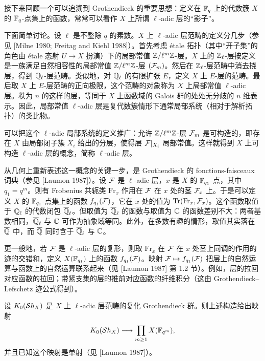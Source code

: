 接下来回顾一个可以追溯到 Grothendieck 的重要思想：定义在 $\mathbb{F}_q$ 上的代数簇 $X$ 的 $\mathbb{F}_q$-点集上的函数，常常可以看作 $X$ 上所谓 $\ell$-adic 层的“影子”。

下面简单讨论。设 $\ell$ 是不整除 $q$ 的素数。$X$ 上 $\ell$-adic 层范畴的定义分几步（参见 [Milne 1980; Freitag and Kiehl 1988]）。首先考虑 étale 拓扑（其中“开子集”的角色由 étale 态射 $U\to X$ 扮演）下的局部常值 $\mathbb{Z}/\ell^m\mathbb{Z}$-层。$X$ 上的 $\mathbb{Z}_\ell$-层按定义是一族满足自然相容性的局部常值 $\mathbb{Z}/\ell^m\mathbb{Z}$-层 $(\mathcal{F}_m)$。然后在 $\mathbb{Z}_\ell$-层范畴中消去挠层，得到 $\mathbb{Q}_\ell$-层范畴。类似地，对 $\mathbb{Q}_\ell$ 的有限扩张 $E$，定义 $X$ 上 $E$-层的范畴。最后取 $X$ 上 $E$-层范畴的正向极限，这个范畴的对象称为 $X$ 上局部常值 $\ell$-adic 层。秩为 $n$ 的这样的层，等同于 $X$ 上函数域的 Galois 群的处处无分歧的 $n$ 维表示。因此，局部常值 $\ell$-adic 层是复代数簇情形下通常局部系统（相对于解析拓扑）的类比物。

可以把这个 $\ell$-adic 局部系统的定义推广：允许 $\mathbb{Z}/\ell^m\mathbb{Z}$-层 $\mathcal{F}_m$ 是可构造的，即存在 $X$ 由局部闭子簇 $X_i$ 给出的分层，使得层 $\mathcal{F}|_{X_i}$ 局部常值。这样就得到 $X$ 上可构造 $\ell$-adic 层的概念，简称 $\ell$-adic 层。

从几何上重新表述这一概念的关键一步，是 Grothendieck 的 fonctions-faisceaux 词典（参见 [Laumon 1987]）。设 $\mathcal{F}$ 是 $\ell$-adic 层，$x$ 是 $X$ 的 $\mathbb{F}_{q_1}$-点，其中 $q_1=q^m$。则有 Frobenius 共轭类 $\mathrm{Fr}_x$ 作用在 $\mathcal{F}$ 在 $x$ 处的茎 $\mathcal{F}_x$ 上。于是可以定义 $X$ 的 $\mathbb{F}_{q_1}$-点集上的函数 $f_{q_1}(\mathcal{F})$，它在 $x$ 处的值为 $\operatorname{Tr}(\mathrm{Fr}_x,\mathcal{F}_x)$。这个函数取值于 $\mathbb{Q}_\ell$ 的代数闭包 $\overline{\mathbb{Q}}_\ell$。但取值为 $\overline{\mathbb{Q}}_\ell$ 的函数与取值为 $\mathbb{C}$ 的函数差别不大：两者基数相同，$\overline{\mathbb{Q}}_\ell$ 与 $\mathbb{C}$ 可作为抽象域等同。此外，在多数有趣的情形，取值其实落在 $\overline{\mathbb{Q}}$ 中，而 $\overline{\mathbb{Q}}$ 同时含于 $\overline{\mathbb{Q}}_\ell$ 与 $\mathbb{C}$。

更一般地，若 $\mathcal{F}$ 是 $\ell$-adic 层的复形，则取 $\mathrm{Fr}_x$ 在 $\mathcal{F}$ 在 $x$ 处茎上同调的作用的迹的交错和，定义 $X(\mathbb{F}_{q_1})$ 上的函数 $f_{q_1}(\mathcal{F})$。映射 $\mathcal{F}\mapsto f_{q_1}(\mathcal{F})$ 把层上的自然运算与函数上的自然运算联系起来（见 [Laumon 1987] 第 1.2 节）。例如，层的拉回对应函数的拉回；带紧支集的层的推前对应函数的纤维积分（这由 Grothendieck--Lefschetz 迹公式得到）。

设 $K_0(\mathcal{S} h_X)$ 是 $X$ 上 $\ell$-adic 层范畴的复化 Grothendieck 群。则上述构造给出映射
\[
    K_0(\mathcal{S} h_X)\longrightarrow \prod_{m\ge 1}X(\mathbb{F}_{q^m}),
\]
并且已知这个映射是单射（见 [Laumon 1987]）。


